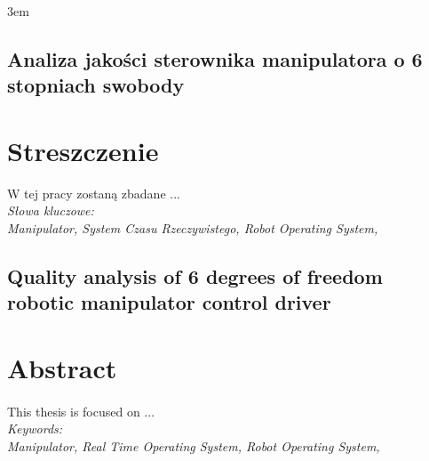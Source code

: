 \documentclass[a4paper, 12pt, twoside]{article}
\begin{document}
\emergencystretch 3em

\begin{figure}
\setlength{\voffset}{0cm}
\setlength{\hoffset}{0cm}
	
\setlength{\voffset}{-2.54cm}
\setlength{\hoffset}{-2.54cm}
\end{figure}
\mbox{}
\newpage
\thispagestyle{empty}
\mbox{}

\newpage
\begin{center}
\section*{Analiza jakości sterownika manipulatora o 6 stopniach swobody}
\end{center}

\section*{Streszczenie}
\thispagestyle{empty}
\justify
W tej pracy zostaną zbadane ...
\vspace{0.5 cm}
\\
\textit{Słowa kluczowe:}
\\
\textit{Manipulator, System Czasu Rzeczywistego, Robot Operating System, }


\newpage
\begin{center}
\section*{Quality analysis of 6 degrees of freedom robotic manipulator control driver}
\end{center}
\thispagestyle{empty}
\section*{Abstract}
\paragraph{}This thesis is focused on ...
\vspace{0.5 cm}
\\
\textit{Keywords:}
\\
\textit{Manipulator, Real Time Operating System, Robot Operating System, }

\newpage

\end{document}
